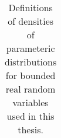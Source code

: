 \begin{landscape}
\begin{table}[htp]
\begin{tabular}{p{4cm}p{5cm}lll}
\bottomrule
\end{tabular}
\caption[Standard bounded density definitions.]{Definitions of densities of parameteric distributions for bounded real random variables used in this thesis.}
\label{tab:standard-distributions-bounded}
\end{table}
\end{landscape}
\restoregeometry